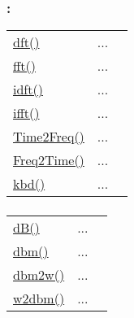 \subsubsection*{: }

\textcolor{blue}{}\begin{tabular}{>{\raggedleft}p{3cm}>{\centering}p{0.5cm}l}
\textcolor{blue}{\hyperlink{dft}{dft()}}&
...&
 \begin{NoHyper} \nameref{par:Discrete-Fourier-Transform} \end{NoHyper}\tabularnewline
\textcolor{blue}{\hyperlink{fft}{fft()}}&
...&
 \begin{NoHyper} \nameref{par:Fast-Fourier-Transform} \end{NoHyper}\tabularnewline
\textcolor{blue}{\hyperlink{idft}{idft()}}&
...&
 \begin{NoHyper} \nameref{par:Inverse-Discrete-Fourier} \end{NoHyper}\tabularnewline
\textcolor{blue}{\hyperlink{ifft}{ifft()}}&
...&
 \begin{NoHyper} \nameref{par:Inverse-Fast-Fourier} \end{NoHyper}\tabularnewline
\textcolor{blue}{\hyperlink{Time2Freq}{Time2Freq()}}&
...&
 \begin{NoHyper} \nameref{par:Interpreted-Discrete-Fourier-Transform} \end{NoHyper}\tabularnewline
\textcolor{blue}{\hyperlink{Freq2Time}{Freq2Time()}}&
...&
 \begin{NoHyper} \nameref{par:Interpreted-Inverse-Discrete-Fourier} \end{NoHyper}\tabularnewline
\textcolor{blue}{\hyperlink{kbd}{kbd()}}&
...&
 \begin{NoHyper} \nameref{par:Kaiser-Bessel-window} \end{NoHyper}\tabularnewline
\end{tabular}




\subsubsection*{}

\textcolor{blue}{}\begin{tabular}{>{\raggedleft}p{3cm}>{\centering}p{0.5cm}l}
\textcolor{blue}{\hyperlink{dB}{dB()}}&
...&
 \begin{NoHyper} \nameref{par:dB} \end{NoHyper}\tabularnewline
\textcolor{blue}{\hyperlink{dbm}{dbm()}}&
...&
 \begin{NoHyper} \nameref{par:dbm} \end{NoHyper}\tabularnewline
\textcolor{blue}{\hyperlink{dbm2w}{dbm2w()}}&
...&
 \begin{NoHyper} \nameref{par:dbm2w} \end{NoHyper}\tabularnewline
\textcolor{blue}{\hyperlink{w2dbm}{w2dbm()}}&
...&
 \begin{NoHyper} \nameref{par:w2dbm} \end{NoHyper}\tabularnewline
\end{tabular}


